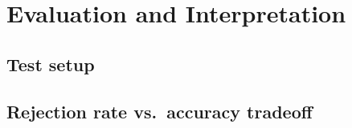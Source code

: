 \chapter{Evaluation and Interpretation}\label{chapter:evaluation}

\section{Test setup}

\section{Rejection rate vs.\ accuracy tradeoff}
